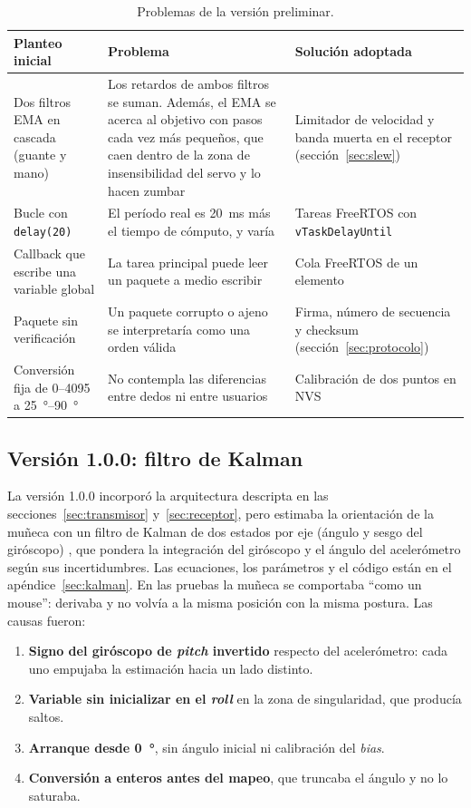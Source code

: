 \begin{table}[H]
\centering
\begin{tabularx}{\textwidth}{X X X}
\toprule
\textbf{Planteo inicial} & \textbf{Problema} & \textbf{Solución adoptada} \\
\midrule
Dos filtros EMA en cascada (guante y mano) & Los retardos de ambos filtros se suman. Además, el EMA se acerca al objetivo con pasos cada vez más pequeños, que caen dentro de la zona de insensibilidad del servo y lo hacen zumbar & Limitador de velocidad y banda muerta en el receptor (sección~\ref{sec:slew}) \\
Bucle con \texttt{delay(20)} & El período real es \SI{20}{\milli\second} más el tiempo de cómputo, y varía & Tareas FreeRTOS con \texttt{vTaskDelayUntil} \\
Callback que escribe una variable global & La tarea principal puede leer un paquete a medio escribir & Cola FreeRTOS de un elemento \\
Paquete sin verificación & Un paquete corrupto o ajeno se interpretaría como una orden válida & Firma, número de secuencia y checksum (sección~\ref{sec:protocolo}) \\
Conversión fija de 0--4095 a \SIrange{25}{90}{\degree} & No contempla las diferencias entre dedos ni entre usuarios & Calibración de dos puntos en NVS \\
\bottomrule
\end{tabularx}
\caption{Problemas de la versión preliminar.}
\label{tab:preliminar}
\end{table}

\subsection{Versión 1.0.0: filtro de Kalman}

La versión 1.0.0 incorporó la arquitectura descripta en las secciones~\ref{sec:transmisor} y~\ref{sec:receptor}, pero estimaba la orientación de la muñeca con un filtro de Kalman de dos estados por eje (ángulo y sesgo del giróscopo) \cite{kalman1960, lauszus_kalman}, que pondera la integración del giróscopo y el ángulo del acelerómetro según sus incertidumbres. Las ecuaciones, los parámetros y el código están en el apéndice~\ref{sec:kalman}. En las pruebas la muñeca se comportaba ``como un mouse'': derivaba y no volvía a la misma posición con la misma postura. Las causas fueron:

\begin{enumerate}
    \item \textbf{Signo del giróscopo de \textit{pitch} invertido} respecto del acelerómetro: cada uno empujaba la estimación hacia un lado distinto.
    \item \textbf{Variable sin inicializar en el \textit{roll}} en la zona de singularidad, que producía saltos.
    \item \textbf{Arranque desde \SI{0}{\degree}}, sin ángulo inicial ni calibración del \textit{bias}.
    \item \textbf{Conversión a enteros antes del mapeo}, que truncaba el ángulo y no lo saturaba.
\end{enumerate}

